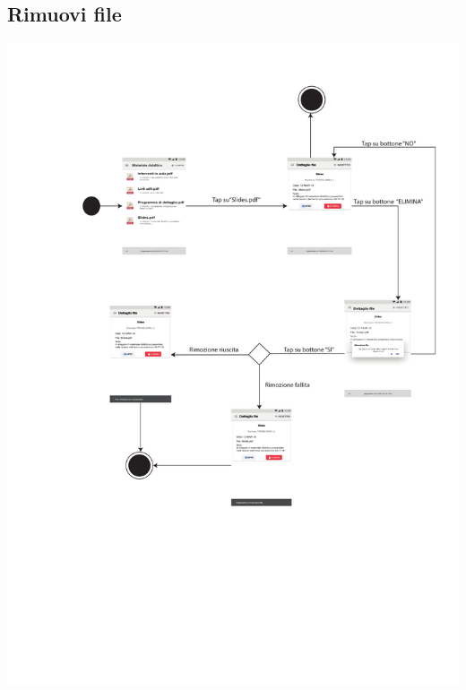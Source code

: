 \subsection{Rimuovi file}
\begin{center}
	\includegraphics[width=6in]{imgs/gruppo1/activity_diagrams/AD17_rimuovi_file.pdf}
\end{center}
\newpage
